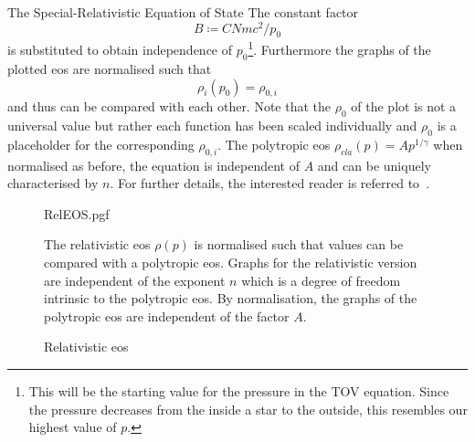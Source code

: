 \begin{subsection}{The Special-Relativistic Equation of State}
The constant factor
\begin{equation}
	B\coloneqq CNmc^2/p_0
	\label{eq:2-IntEner-FactorExplanation}
\end{equation}
is substituted to obtain independence of $p_0$\footnote{This will be the starting value for the pressure in the \acl{TOV} equation. Since the pressure decreases from the inside a star to the outside, this resembles our highest value of $p$.}.
Furthermore the graphs of the plotted \ac{eos} are normalised such that
\begin{equation}
	\rho_{i}(p_0)=\rho_{0,i}
	\label{eq:2-IntEner-Plt-Initial-Val-Def}
\end{equation}
and thus can be compared with each other.
Note that the $\rho_0$ of the plot is not a universal value but rather each function has been scaled individually and $\rho_0$ is a placeholder for the corresponding $\rho_{0,i}$.
The polytropic \ac{eos} $\rho_{cla}(p)=Ap^{1/\gamma}$ when normalised as before, the equation is independent of $A$ and can be uniquely characterised by $n$. %
For further details, the interested reader is referred to~\cite{pleyerGithubRepositoryJonas2021}.
\begin{figure}[H]
	{\centering
	{RelEOS.pgf}
	}
	\caption{Relativistic \acl{eos}}
	\label{fig:2-IntEner-RelEOSPlot}
	\small
	The relativistic \ac{eos} $\rho(p)$ is normalised such that values can be compared with a polytropic \ac{eos}.
	Graphs for the relativistic version are independent of the exponent $n$ which is a degree of freedom intrinsic to the polytropic \ac{eos}.
	By normalisation, the graphs of the polytropic \ac{eos} are independent of the factor $A$.
\end{figure}
\end{subsection}